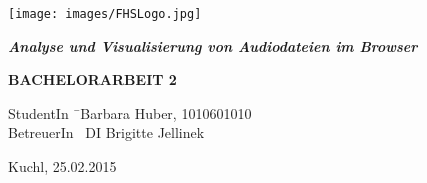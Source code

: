 \begin{titlepage}
\begin{center}

\texttt{[image: images/FHSLogo.jpg]}

\vspace*{4cm}

\Large{
	\textit{\textbf{Analyse und Visualisierung von Audiodateien im Browser}}
}

\vspace*{4cm}

\large{
	\textbf{BACHELORARBEIT 2}
}

\end{center}

\vfill

\begin{tabbing}
StudentIn \= \ Barbara Huber, 1010601010 \\
BetreuerIn \> \ DI Brigitte Jellinek
\end{tabbing}

Kuchl, 25.02.2015

\end{titlepage}
